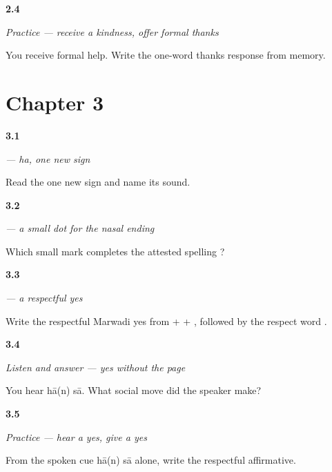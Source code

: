 \noindent\begin{minipage}[t]{\linewidth}
\raggedright
\hypertarget{review-MW-C02-practice-thanks}{\textbf{2.4}} \emph{Practice — receive a kindness, offer formal thanks}\par
\small You receive formal help. Write the one-word thanks response from memory.
\end{minipage}\par\medskip

\section*{Chapter 3}

\noindent\begin{minipage}[t]{\linewidth}
\raggedright
\hypertarget{review-MW-W03-ha-read}{\textbf{3.1}} \emph{ — \emph{ha}, one new sign}\par
\small Read the one new sign  and name its sound.
\end{minipage}\par\medskip

\noindent\begin{minipage}[t]{\linewidth}
\raggedright
\hypertarget{review-MW-W03-anusvara-add}{\textbf{3.2}} \emph{ — a small dot for the nasal ending}\par
\small Which small mark completes the attested spelling ?
\end{minipage}\par\medskip

\noindent\begin{minipage}[t]{\linewidth}
\raggedright
\hypertarget{review-MW-C03-haan-saa-build}{\textbf{3.3}} \emph{  — a respectful yes}\par
\small Write the respectful Marwadi yes from  +  + , followed by the respect word .
\end{minipage}\par\medskip

\noindent\begin{minipage}[t]{\linewidth}
\raggedright
\hypertarget{review-MW-C03-listen-say-choice}{\textbf{3.4}} \emph{Listen and answer — yes without the page}\par
\small You hear hā(n) sā. What social move did the speaker make?
\end{minipage}\par\medskip

\noindent\begin{minipage}[t]{\linewidth}
\raggedright
\hypertarget{review-MW-C03-practice-yes}{\textbf{3.5}} \emph{Practice — hear a yes, give a yes}\par
\small From the spoken cue hā(n) sā alone, write the respectful affirmative.
\end{minipage}\par\medskip

